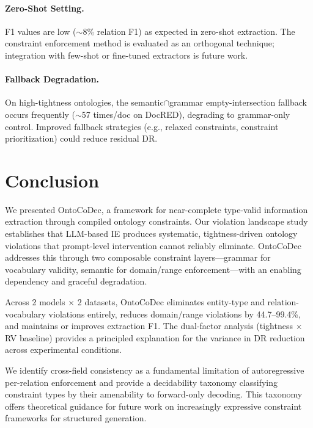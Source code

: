 \documentclass[11pt,a4paper]{article}
\newcommand{\sys}{OntoCoDec}
\begin{document}
\paragraph{Zero-Shot Setting.} F1 values are low ($\sim$8\% relation F1) as expected in zero-shot extraction. The constraint enforcement method is evaluated as an orthogonal technique; integration with few-shot or fine-tuned extractors is future work.

\paragraph{Fallback Degradation.} On high-tightness ontologies, the semantic$\cap$grammar empty-intersection fallback occurs frequently ($\sim$57 times/doc on DocRED), degrading to grammar-only control. Improved fallback strategies (e.g., relaxed constraints, constraint prioritization) could reduce residual DR.

\section{Conclusion}
\label{sec:conclusion}

We presented \sys{}, a framework for near-complete type-valid information extraction through compiled ontology constraints. Our violation landscape study establishes that LLM-based IE produces systematic, tightness-driven ontology violations that prompt-level intervention cannot reliably eliminate. \sys{} addresses this through two composable constraint layers---grammar for vocabulary validity, semantic for domain/range enforcement---with an enabling dependency and graceful degradation.

Across 2 models $\times$ 2 datasets, \sys{} eliminates entity-type and relation-vocabulary violations entirely, reduces domain/range violations by 44.7--99.4\%, and maintains or improves extraction F1. The dual-factor analysis (tightness $\times$ RV baseline) provides a principled explanation for the variance in DR reduction across experimental conditions.

We identify cross-field consistency as a fundamental limitation of autoregressive per-relation enforcement and provide a decidability taxonomy classifying constraint types by their amenability to forward-only decoding. This taxonomy offers theoretical guidance for future work on increasingly expressive constraint frameworks for structured generation.
\end{document}

